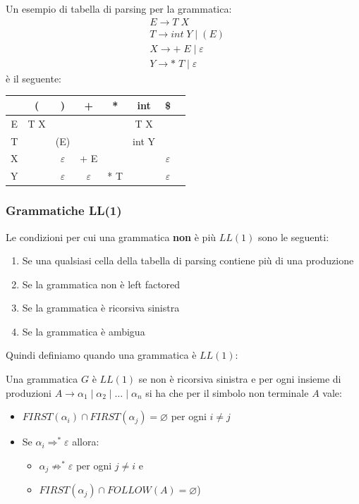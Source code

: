 \documentclass[a4paper]{article}
\begin{document}
\begin{example}
  Un esempio di tabella di parsing per la grammatica:
  \[
    \begin{aligned}
      &E \to T \; X \\
      &T \to int \; Y \mid (E) \\
      &X \to + \; E \mid \varepsilon \\
      &Y \to * \; T \mid \varepsilon
    \end{aligned}
  \] 
  è il seguente:
  \begin{table}[H]
    \centering
    \begin{tabular}{|c|c|c|c|c|c|c|c|}
      \hline
      & ( & ) & + & * & int & \$ \\
      \hline
      E & T X & & & & T X & \\
      \hline
      T & & (E) & & & int Y & \\
      \hline
      X & & $\varepsilon$ & + E & & & $\varepsilon$ \\
      \hline
      Y & & $\varepsilon$ & $\varepsilon$ & * T & & $\varepsilon$ \\
      \hline
    \end{tabular}
  \end{table}
\end{example}

\subsubsection{Grammatiche LL(1)}
Le condizioni per cui una grammatica \textbf{non} è più \( LL(1) \) sono le seguenti:
\begin{enumerate}
  \item Se una qualsiasi cella della tabella di parsing contiene più di una produzione
  \item Se la grammatica non è left factored
  \item Se la grammatica è ricorsiva sinistra
  \item Se la grammatica è ambigua
\end{enumerate}
Quindi definiamo quando una grammatica è \( LL(1) \):
\begin{definition}
  Una grammatica \( G \) è \( LL(1) \) se non è ricorsiva sinistra e per ogni
  insieme di produzioni \( A \to \alpha_1 \mid \alpha_2 \mid \ldots \mid \alpha_n \) si
  ha che per il simbolo non terminale \( A \) vale:
  \begin{itemize}
    \item \( FIRST(\alpha_i) \cap FIRST(\alpha_j) = \varnothing \) per ogni \( i \neq j \)
    \item Se \( \alpha_i \Rightarrow^* \varepsilon \) allora:
      \begin{itemize}
        \item \( \alpha_j \not\Rightarrow^* \varepsilon  \) per ogni \( j \neq i \) e
        \item \( FIRST(\alpha_j) \cap FOLLOW(A) = \varnothing \))
      \end{itemize}
  \end{itemize}
\end{definition}
\end{document}

